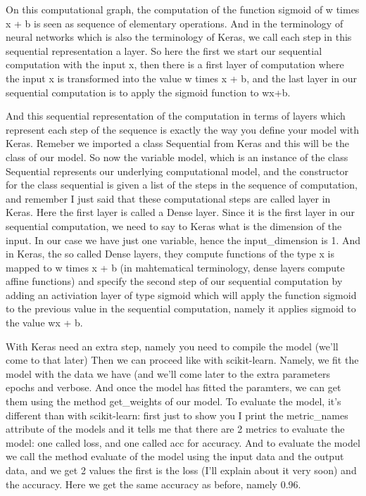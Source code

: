 \documentclass{article}
\begin{document}
On this computational graph, the computation of the function sigmoid of w times x + b
is seen as sequence of elementary operations.
And in the terminology of neural networks which is also the terminology of Keras, 
we call each step in this sequential representation a layer. 
So here the first we start our sequential computation with the input x, 
then there is a first layer of computation where the input x is transformed into 
the value w times x + b, 
and the last layer in our sequential computation is to apply the sigmoid function to wx+b.

And this sequential representation of the computation in terms of layers which represent each step 
of the sequence is 
exactly the way you define your model with Keras.
Remeber we imported a class Sequential from Keras and this will be the class of our model.
So now the variable model, which is an instance of the 
class Sequential represents our underlying computational model, 
and the constructor for the class sequential is given a list of the steps in the sequence of computation, 
and remember I just said that these computational steps are called layer in Keras.
Here the first layer is called a Dense layer. 
Since it is the first layer in our sequential computation, we need to say to Keras what is the dimension 
of the input. 
In our case we have just one variable, hence the input\_dimension is 1.
And in Keras, the so called Dense layers, they compute functions of the type 
x is mapped to w times x + b (in mahtematical terminology, dense layers compute affine functions)
and specify the second step of our sequential computation by adding an activiation layer of type sigmoid 
which will apply the function sigmoid to the previous value in the sequential computation, 
namely it applies sigmoid to the value wx + b.

With Keras need an extra step, namely you need to compile the model (we'll come to that later)
Then we can proceed like with scikit-learn. 
Namely, we fit the model with the data we have (and we'll come later to the extra parameters 
epochs and verbose.
And once the model has fitted the paramters, we can get them using the method get\_weights of our model.
To evaluate the model, it's different than with scikit-learn:
first just to show you I print the metric\_names attribute of the models and it tells me
that there are 2 metrics to evaluate the model: one called loss, and one called acc for accuracy.
And to evaluate the model we call the method evaluate of the model using the input data and the output data, 
and we get 2 values the first is the loss (I'll explain about it very soon) and the accuracy. 
Here we get the same accuracy as before, namely 0.96.
\end{document}
